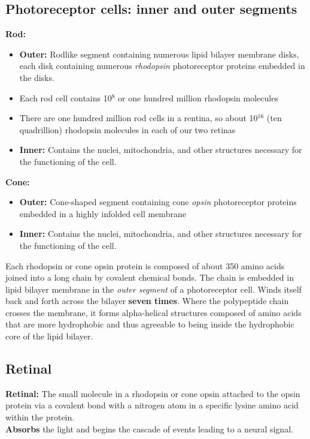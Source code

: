 \documentclass{article}
\begin{document}
\subsection{Photoreceptor cells: inner and outer segments}

\textbf{Rod:}
\begin{itemize}
    \item \textbf{Outer:} Rodlike segment containing numerous lipid bilayer membrane disks, each disk containing numerous \textit{rhodopsin} photoreceptor proteins embedded in the disks. 
    \item Each rod cell contains 10$^8$ or one hundred million rhodopsin molecules
    \item There are one hundred million rod cells in a rentina, so about 10$^16$ (ten quadrillion) rhodopsin molecules in each of our two retinas
    \item \textbf{Inner:} Contains the nuclei, mitochondria, and other structures necessary for the functioning of the cell. 
\end{itemize}

\textbf{Cone:}
\begin{itemize}
    \item \textbf{Outer:} Cone-shaped segment containing cone \textit{opsin} photoreceptor proteins embedded in a highly infolded cell membrane
    \item \textbf{Inner:} Contains the nuclei, mitochondria, and other structures necessary for the functioning of the cell. 
\end{itemize}

Each rhodopsin or cone opsin protein is composed of about 350 amino acids joined into a long chain by covalent chemical bonds. The chain is embedded in lipid bilayer membrane in the \textit{outer segment} of a photoreceptor cell. Winds itself back and forth across the bilayer \textbf{seven times}. Where the polypeptide chain crosses the membrane, it forms alpha-helical structures composed of amino acids that are more hydrophobic and thus agreeable to being inside the hydrophobic core of the lipid bilayer. \\

\subsection{Retinal}
\textbf{Retinal:} The small molecule in a rhodopsin or cone opsin attached to the opsin protein via a covalent bond with a nitrogen atom in a specific lysine amino acid within the protein. \\
\textbf{Absorbs} the light and begins the cascade of events leading to a neural signal. \\
\end{document}
